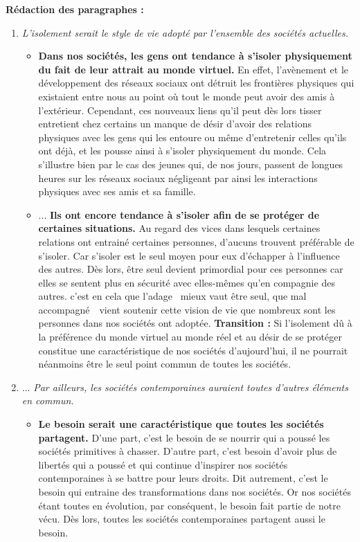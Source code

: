 \noindent \textbf{Rédaction des paragraphes :}
\begin{enumerate}[label*=$\longrightarrow$]
	\item \textit{L'isolement serait le style de vie adopté par l'ensemble des sociétés actuelles.}
	\begin{itemize}
		\item \textbf{Dans nos sociétés, les gens ont tendance à s'isoler physiquement du fait de leur attrait au monde virtuel.} En effet, l'avènement et le développement des réseaux sociaux ont détruit les frontières physiques qui existaient entre nous au point où tout le monde peut avoir des amis à l'extérieur. Cependant, ces nouveaux liens qu'il peut dès lors tisser entretient chez certains un manque de désir d'avoir des relations physiques avec les gens qui les entoure ou même d'entretenir celles qu'ils ont déjà, et les pousse ainsi à s'isoler physiquement du monde. Cela s'illustre bien par le cas des jeunes qui, de nos jours, passent de longues heures sur les réseaux sociaux négligeant par ainsi les interactions physiques avec ses amis et sa famille.
		\item ... \textbf{Ils ont encore tendance à s'isoler afin de se protéger de certaines situations.} Au regard des vices dans lesquels certaines relations ont entrainé certaines personnes, d'aucuns trouvent préférable de s'isoler. Car s'isoler est le seul moyen pour eux d'échapper à l'influence des autres. Dès lors, être seul devient primordial pour ces personnes car elles se sentent plus en sécurité avec elles-mêmes qu'en compagnie des autres. c'est en cela que l'adage \guillemetleft\ mieux vaut être seul, que mal accompagné\ \guillemetright\ vient soutenir cette vision de vie que nombreux sont les personnes dans nos sociétés ont adoptée. \newline \textbf{Transition :} Si l'isolement dû à la préférence du monde virtuel au monde réel et au désir de se protéger constitue une caractéristique de nos sociétés d'aujourd'hui, il ne pourrait néanmoins être le seul point commun de toutes les sociétés.
	\end{itemize}
	\item ... \textit{Par ailleurs, les sociétés contemporaines auraient toutes d'autres éléments en commun.}
	\begin{itemize}
		\item \textbf{Le besoin serait une caractéristique que toutes les sociétés partagent.} D'une part, c'est le besoin de se nourrir qui a poussé les sociétés primitives à chasser. D'autre part, c'est besoin d'avoir plus de libertés qui a poussé et qui continue d'inspirer nos sociétés contemporaines à se battre pour leurs droits. Dit autrement, c'est le besoin qui entraine des transformations dans nos sociétés. Or nos sociétés étant toutes en évolution, par conséquent, le besoin fait partie de notre vécu. Dès lors, toutes les sociétés contemporaines partagent aussi le besoin.

\end{itemize}
\end{enumerate}
